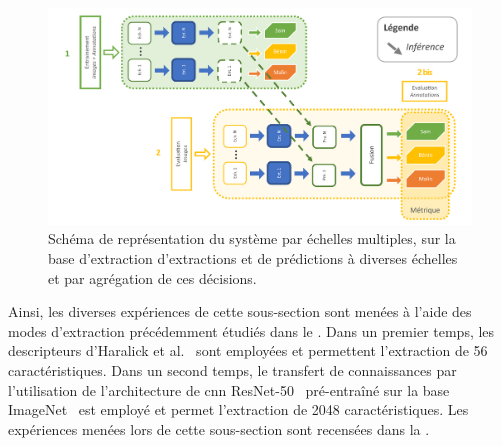 \begin{figure}[H]
    \centering
    \includegraphics[width=0.95\linewidth]{contents/chapter_6/resources/scheme_image_improvement_multiscale_decision.pdf}
    \caption{Schéma de représentation du système par échelles multiples, sur la base d'extraction d'extractions et de prédictions à diverses échelles et par agrégation de ces décisions.}
    \label{fig:scheme_image_improvement_multiscale_decision}
\end{figure}\par

Ainsi, les diverses expériences de cette sous-section sont menées à l'aide des modes d'extraction précédemment étudiés dans le . Dans un premier temps, les descripteurs d'Haralick et al.~\cite{Haralick1973} sont employées et permettent l'extraction de 56 caractéristiques. Dans un second temps, le transfert de connaissances par l'utilisation de l'architecture de \gls{cnn} ResNet-50~\cite{He2016} pré-entraîné sur la base ImageNet~\cite{Canziani2016} est employé et permet l'extraction de 2048 caractéristiques. Les expériences menées lors de cette sous-section sont recensées dans la .\par

